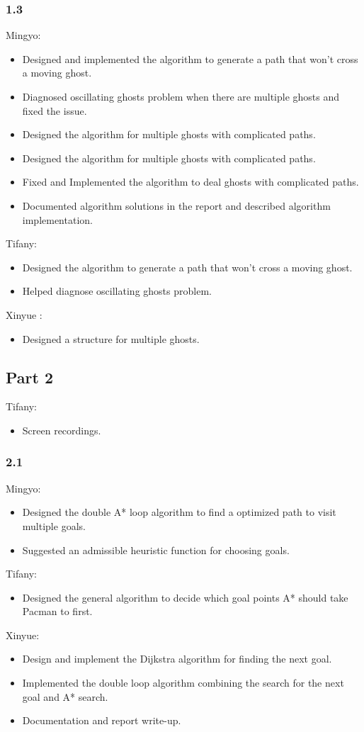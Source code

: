 \subsubsection*{1.3}
Mingyo:
\begin{itemize}[itemsep=0pt]
  \item Designed and implemented the algorithm to generate a path that won't cross a moving ghost.
  \item Diagnosed oscillating ghosts problem when there are multiple ghosts and fixed the issue.
  \item Designed the algorithm for multiple ghosts with complicated paths.
  \item Designed the algorithm for multiple ghosts with complicated paths.
  \item Fixed and Implemented the algorithm to deal ghosts with complicated paths.
  \item Documented algorithm solutions in the report and described algorithm implementation.
\end{itemize}
Tifany:
\begin{itemize}[itemsep=0pt]
  \item Designed the algorithm to generate a path that won't cross a moving ghost.
  \item Helped diagnose oscillating ghosts problem.
\end{itemize}
Xinyue : 
\begin{itemize}[itemsep=0pt]
  \item Designed a structure for multiple ghosts.
\end{itemize}

\subsection*{Part 2}
Tifany:
\begin{itemize}[itemsep=0pt]
  \item Screen recordings.
\end{itemize}
\subsubsection*{2.1}
Mingyo:
\begin{itemize}[itemsep=0pt]
  \item Designed the double A* loop algorithm to find a optimized path to visit multiple goals.
  \item Suggested an admissible heuristic function for choosing goals.
\end{itemize}
Tifany:
\begin{itemize}[itemsep=0pt]
  \item Designed the general algorithm to decide which goal points A* should take Pacman to first.
\end{itemize}
Xinyue:
\begin{itemize}[itemsep=0pt]
	\item Design and implement the Dijkstra algorithm for finding the next goal.
	\item Implemented the double loop algorithm combining the search for the next goal and A* search.
	\item Documentation and report write-up. 
\end{itemize}
